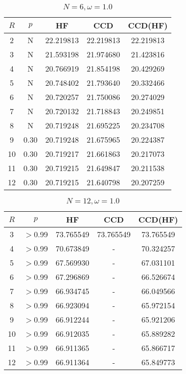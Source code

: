     \begin{table}[H]
    \centering
    \caption{$N = 6, \omega = 1.0$}
    \begin{tabular}{ccccc}
    \toprule
    $R$ & $p$ & HF & CCD & CCD(HF) \\
    \midrule
    2 & N & 22.219813 & 22.219813 & 22.219813 \\
    3 & N & 21.593198 & 21.974680 & 21.423816 \\
    4 & N & 20.766919 & 21.854198 & 20.429269 \\
    5 & N & 20.748402 & 21.793640 & 20.332466 \\
    6 & N & 20.720257 & 21.750086 & 20.274029 \\
    7 & N & 20.720132 & 21.718843 & 20.249851 \\
    8 & N & 20.719248 & 21.695225 & 20.234708 \\
    9 & 0.30 & 20.719248 & 21.675965 & 20.224387 \\
    10 & 0.30 & 20.719217 & 21.661863 & 20.217073 \\
    11 & 0.30 & 20.719215 & 21.649847 & 20.211538 \\
    12 & 0.30 & 20.719215 & 21.640798 & 20.207259 \\
    \bottomrule
    \end{tabular}
\end{table}
    
    \begin{table}[H]
    \centering
    \caption{$N = 12, \omega = 1.0$}
    \begin{tabular}{ccccc}
    \toprule
    $R$ & $p$ & HF & CCD & CCD(HF) \\
    \midrule
    3 & $>$0.99 & 73.765549 & 73.765549 & 73.765549 \\
    4 & $>$0.99 & 70.673849 & - & 70.324257 \\
    5 & $>$0.99 & 67.569930 & - & 67.031101 \\
    6 & $>$0.99 & 67.296869 & - & 66.526674 \\
    7 & $>$0.99 & 66.934745 & - & 66.049566 \\
    8 & $>$0.99 & 66.923094 & - & 65.972154 \\
    9 & $>$0.99 & 66.912244 & - & 65.921206 \\
    10 & $>$0.99 & 66.912035 & - & 65.889282 \\
    11 & $>$0.99 & 66.911365 & - & 65.866717 \\
    12 & $>$0.99 & 66.911364 & - & 65.849773 \\
    \bottomrule
    \end{tabular}
\end{table}
    

